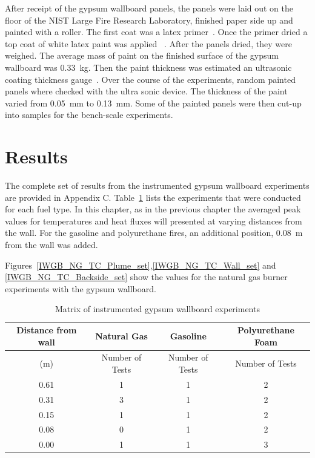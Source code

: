 \documentclass[twoside]{uocthesis}
\begin{document}
After receipt of the gypsum wallboard panels, the panels were laid out on the floor of the NIST Large Fire Research Laboratory, finished paper side up and painted with a roller.  The first coat was a latex primer~\cite{Latex_Primer}.  Once the primer dried a top coat of white latex paint was applied ~\cite{Latex_Paint}.  After the panels dried, they were weighed. The average mass of paint on the finished surface of the gypsum wallboard was 0.33~kg. Then the paint thickness was estimated an ultrasonic coating thickness gauge~\cite{defelsko}.  Over the course of the experiments, random painted panels where checked with the ultra sonic device. The thickness of the paint varied from 0.05~mm to 0.13~mm.  Some of the painted panels were then cut-up into samples for the bench-scale experiments.


\section{Results}

The complete set of results from the instrumented gypsum wallboard experiments are provided in Appendix C. Table~\ref{tab:IWGB_experiments} lists the experiments that were conducted for each fuel type.  In this chapter, as in the previous chapter the averaged peak values for temperatures and heat fluxes will presented at varying distances from the wall.  For the gasoline and polyurethane fires, an additional position, 0.08~m from the wall was added.

Figures~\ref{IWGB_NG_TC_Plume_set},\ref{IWGB_NG_TC_Wall_set} and \ref{IWGB_NG_TC_Backside_set} show the values for the natural gas burner experiments with the gypsum wallboard.

\begin{table}
	\centering
	\begin{tabular}{|c|c|c|c|}
		\hline Distance from wall  	& Natural Gas 		& Gasoline			& Polyurethane Foam \\
		\hline (m) 					& Number of Tests 	& Number of Tests  	& Number of Tests 	\\ \hline
		\hline 0.61 				& 1 				& 1 				& 2 			 	\\
		\hline 0.31					& 3	 				& 1					& 2 			 	\\
		\hline 0.15					& 1				 	& 1					& 2 			 	\\
		\hline 0.08					& 0 				& 1 				& 2 	 			\\
		\hline 0.00					& 1 				& 1 				& 3 	 			\\
		\hline
	\end{tabular}
	\caption[Matrix of instrumented gypsum wallboard experiments]{Matrix of instrumented gypsum wallboard experiments}
	\label{tab:IWGB_experiments}
\end{table}
\end{document}
